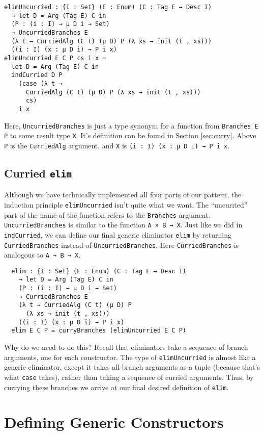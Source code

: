 \documentclass[preprint,nonatbib]{sigplanconf}
\begin{document}
\begin{verbatim}
elimUncurried : {I : Set} (E : Enum) (C : Tag E → Desc I)
  → let D = Arg (Tag E) C in
  (P : (i : I) → μ D i → Set)
  → UncurriedBranches E
  (λ t → CurriedAlg (C t) (μ D) P (λ xs → init (t , xs)))
  ((i : I) (x : μ D i) → P i x)
elimUncurried E C P cs i x =
  let D = Arg (Tag E) C in
  indCurried D P
    (case (λ t →
      CurriedAlg (C t) (μ D) P (λ xs → init (t , xs)))
      cs)
    i x
\end{verbatim}

Here, {\tt UncurriedBranches} is just a type synonym for a function
from {\tt Branches E P} to some result type {\tt X}.
It's definition can
be found in Section \ref{sec:curry}. 
Above {\tt P} is
the {\tt CurriedAlg} argument, and {\tt X} is
{\tt (i : I) (x : μ D i) → P i x}.

\subsection{Curried {\tt elim}}

Although we have technically implemented all four parts of our
pattern, the induction principle {\tt elimUncurried} isn't quite what
we want. The ``uncurried'' part of the name of the function refers to
the {\tt Branches} argument.
{\tt UncurriedBranches} is similar to the function
{\tt A × B → X}. Just like we did in {\tt indCurried}, we can define
our final generic eliminator {\tt elim} by returning
{\tt CurriedBranches} instead of {\tt UncurriedBranches}. Here
{\tt CurriedBranches} is analogous to {\tt A → B → X}.

\begin{verbatim}
  elim : {I : Set} (E : Enum) (C : Tag E → Desc I)
    → let D = Arg (Tag E) C in
    (P : (i : I) → μ D i → Set)
    → CurriedBranches E
    (λ t → CurriedAlg (C t) (μ D) P
      (λ xs → init (t , xs)))
    ((i : I) (x : μ D i) → P i x)
  elim E C P = curryBranches (elimUncurried E C P)
\end{verbatim}

Why do we need to do this? Recall that eliminators take a sequence of
branch arguments, one for each constructor. The type of
{\tt elimUncurried} is almost like a generic eliminator, except it
takes all branch arguments as a tuple (because that's what {\tt case}
takes), rather than taking a sequence of curried arguments. Thus, by
currying these branches we arrive at our final desired definition of
{\tt elim}.

\section{Defining Generic Constructors}
\label{sec:init}
\end{document}
